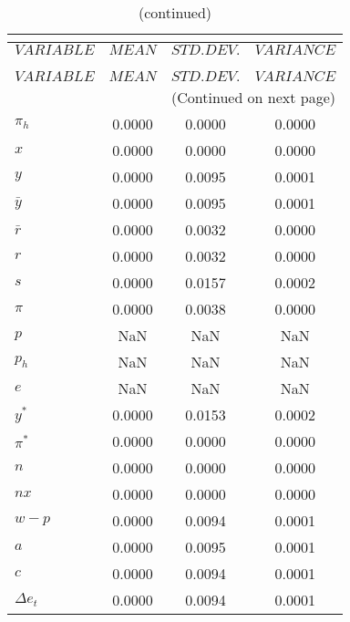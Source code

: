  
\begin{center}
\begin{longtable}{lccc} 
\caption{THEORETICAL MOMENTS}\\
 \label{Table:th_moments}\\
\toprule 
$VARIABLE    $	 & 	 $         MEAN$	 & 	 $    STD. DEV.$	 & 	 $     VARIANCE$\\
\midrule \endfirsthead 
\caption{(continued)}\\
 \toprule \\ 
$VARIABLE    $	 & 	 $         MEAN$	 & 	 $    STD. DEV.$	 & 	 $     VARIANCE$\\
\midrule \endhead 
\midrule \multicolumn{4}{r}{(Continued on next page)} \\ \bottomrule \endfoot 
\bottomrule \endlastfoot 
${\pi_h}     $	 & 	       0.0000	 & 	       0.0000	 & 	       0.0000 \\ 
$x           $	 & 	       0.0000	 & 	       0.0000	 & 	       0.0000 \\ 
$y           $	 & 	       0.0000	 & 	       0.0095	 & 	       0.0001 \\ 
${\bar y}    $	 & 	       0.0000	 & 	       0.0095	 & 	       0.0001 \\ 
${\bar r}    $	 & 	       0.0000	 & 	       0.0032	 & 	       0.0000 \\ 
$r           $	 & 	       0.0000	 & 	       0.0032	 & 	       0.0000 \\ 
$s           $	 & 	       0.0000	 & 	       0.0157	 & 	       0.0002 \\ 
${\pi}       $	 & 	       0.0000	 & 	       0.0038	 & 	       0.0000 \\ 
$p           $	 & 	          NaN	 & 	          NaN	 & 	          NaN \\ 
${p_h}       $	 & 	          NaN	 & 	          NaN	 & 	          NaN \\ 
$e           $	 & 	          NaN	 & 	          NaN	 & 	          NaN \\ 
${y^*}       $	 & 	       0.0000	 & 	       0.0153	 & 	       0.0002 \\ 
${\pi^{*}}   $	 & 	       0.0000	 & 	       0.0000	 & 	       0.0000 \\ 
${n}         $	 & 	       0.0000	 & 	       0.0000	 & 	       0.0000 \\ 
${nx}        $	 & 	       0.0000	 & 	       0.0000	 & 	       0.0000 \\ 
${w-p}       $	 & 	       0.0000	 & 	       0.0094	 & 	       0.0001 \\ 
$a           $	 & 	       0.0000	 & 	       0.0095	 & 	       0.0001 \\ 
$c           $	 & 	       0.0000	 & 	       0.0094	 & 	       0.0001 \\ 
$\Delta e_t  $	 & 	       0.0000	 & 	       0.0094	 & 	       0.0001 \\ 
\end{longtable}
 \end{center}
